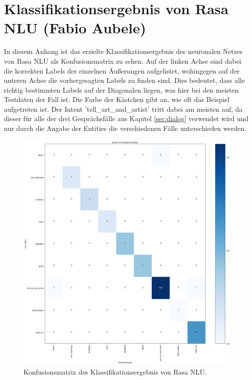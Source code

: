\section{Klassifikationsergebnis von Rasa NLU (Fabio Aubele)}\label{anhang:nlu}
In diesem Anhang ist das erzielte Klassifikationsergebnis des neuronalen Netzes von Rasa NLU als Konfusionsmatrix zu sehen. Auf der linken Achse sind dabei die korrekten Labels der einzelnen Äußerungen aufgelistet, wohingegen auf der unteren Achse die vorhergesagten Labels zu finden sind. Dies bedeutet, dass alle richtig bestimmten Labels auf der Diagonalen liegen, was hier bei den meisten Testdaten der Fall ist. Die Farbe der Kästchen gibt an, wie oft das Beispiel aufgetreten ist. Der Intent 'tell\_art\_and\_artist' tritt dabei am meisten auf, da dieser für alle der drei Gesprächsfälle aus Kapitel \ref{sec:dialog} verwendet wird und nur durch die Angabe der Entities die verschiedenen Fälle unterschieden werden.
\begin{figure}[htbp]
	\centerline{\includegraphics[width=1\linewidth]{figures/confmat.png}}
	\caption{Konfusionsmatrix des Klassifikationsergebnis von Rasa NLU.}
	\label{confnlu}
\end{figure}

\newpage

